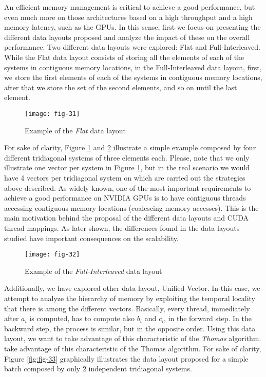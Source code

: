 An efficient memory management is critical to achieve a good performance, but even
much more on those architectures based on a high throughput and a high memory
latency, such as the GPUs. In this sense, first we focus on presenting the different data
layouts proposed and analyze the impact of these on the overall performance. Two
different data layouts were explored: Flat and Full-Interleaved. While the Flat data
layout consists of storing all the elements of each of the systems in contiguous memory
locations, in the Full-Interleaved data layout, first, we store the first elements of each
of the systems in contiguous memory locations, after that we store the set of the second
elements, and so on until the last element.

\begin{figure}[htbp]
    \centering
    \texttt{[image: fig-31]}
    \caption{Example of the \textit{Flat} data layout}
    \label{fig:fig-31}
\end{figure}

For sake of clarity, Figure \ref{fig:fig-31} and \ref{fig:fig-32} illustrate a simple example composed by four
different tridiagonal systems of three elements each. Please, note that we only illustrate
one vector per system in Figure \ref{fig:fig-31}, but in the real scenario we would have 4 vectors
per tridiagonal system on which are carried out the strategies above described. As
widely known, one of the most important requirements to achieve a good performance
on NVIDIA GPUs is to have contiguous threads accessing contiguous memory locations
(coalescing memory accesses). This is the main motivation behind the proposal of the
different data layouts and CUDA thread mappings. As later shown, the differences
found in the data layouts studied have important consequences on the scalability.

\begin{figure}[htbp]
    \centering
    \texttt{[image: fig-32]}
    \caption{Example of the \textit{Full-Interleaved} data layout}
    \label{fig:fig-32}
\end{figure}

Additionally, we have explored other data-layout, Unified-Vector. In this case, we
attempt to analyze the hierarchy of memory by exploiting the temporal locality that
there is among the different vectors. Basically, every
thread, immediately after $a_i$ is computed, has to compute also 
$b_i$ and $c_i$, in the forward step. In the backward step, the process
is similar, but in the opposite order. Using this data layout, we want to take advantage of
this characteristic of the \textit{Thomas} algorithm.
take advantage of this characteristic of the Thomas algorithm.
For sake of clarity, Figure \ref{fig:fig-33} 
graphically illustrates the data layout proposed for a simple batch 
composed by only 2 independent tridiagonal systems.

